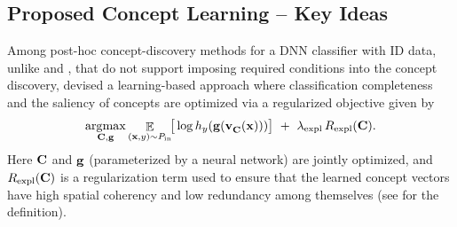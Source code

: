 \fi

\subsection{Proposed Concept Learning -- Key Ideas}
\label{sec:concept_learning}

Among post-hoc concept-discovery methods for a DNN classifier with ID data, 
unlike \citeauthor{kim2018tcav} and \citeauthor{ghorbani2019ace}, that do not support imposing required conditions into the concept discovery, \citeauthor{yeh2020completeness} devised a learning-based approach where classification completeness and the saliency of concepts are optimized via a regularized objective given by
\vspace{-1mm}
\begin{equation}
\label{equ: baseline}
    \argmax_{\bfC, \bfg} \expec_{(\bfx, y) \sim \Pin}\!\!\big[ \log h_y(\bfg(\VC(\bfx))) \big] ~+~ \lambda_{\textrm{expl}}\, R_{\textrm{expl}}(\bfC).
\end{equation}
Here $\mathbf{C}$ and $\mathbf{g}$ (parameterized by a neural network) are jointly optimized, and $R_{\textrm{expl}}(\mathbf{C})$ is a regularization term used to ensure that the learned concept vectors have high spatial coherency and low redundancy among themselves (see \citet{yeh2020completeness} for the definition).
